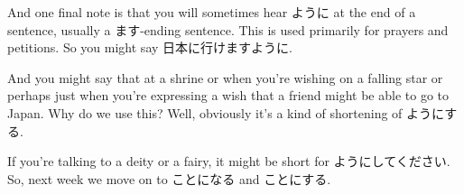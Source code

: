 And one final note is that you will sometimes hear ように at the end of a sentence, usually a ます-ending sentence. This is used primarily for prayers and petitions. So you might say 日本に行けますように.

And you might say that at a shrine or when you're wishing on a falling star or perhaps just when you're expressing a wish that a friend might be able to go to Japan. Why do we use this? Well, obviously it's a kind of shortening of ようにする.

If you're talking to a deity or a fairy, it might be short for ようにしてください. So, next week we move on to ことになる and ことにする.

\stopsectionlevel

\stopsectionlevel

